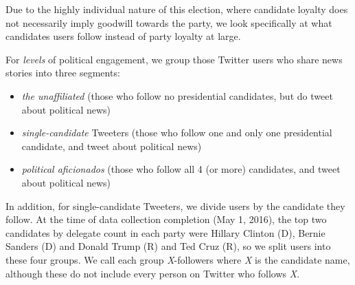 Due to the highly individual nature of this election, where candidate loyalty does not necessarily imply goodwill towards the party, we look specifically at what candidates users follow instead of party loyalty at large. 

For \emph{levels} of political engagement, we group those Twitter users who share news stories into three segments: 

\begin{itemize}
  \item \emph{the unaffiliated} (those who follow no presidential candidates, but do tweet about political news)
  \item \emph{single-candidate} Tweeters (those who follow one and only one presidential candidate, and tweet about political news)
  \item \emph{political aficionados} (those who follow all 4 (or more) candidates, and tweet about political news)
\end{itemize}

In addition, for single-candidate Tweeters, we divide users by the candidate they follow. At the time of data collection completion (May 1, 2016), the top two candidates by delegate count in each party were Hillary Clinton (D), Bernie Sanders (D) and Donald Trump (R) and Ted Cruz (R), so we split users into these four groups. We call each group \emph{X}-followers where \emph{X} is the candidate name, although these do not include every person on Twitter who follows \emph{X}.  
 


